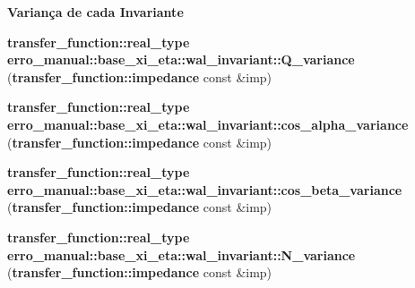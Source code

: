 \begin{Indent}{\bf Variança de cada Invariante}
\begin{CompactItemize}
\item 
{\bf transfer\_\-function::real\_\-type} \textbf{erro\_\-manual::base\_\-xi\_\-eta::wal\_\-invariant::Q\_\-variance} ({\bf transfer\_\-function::impedance} const \&imp)\label{namespaceerro__manual_1_1base__xi__eta_1_1wal__invariant_864b6c7439ca932ea9fa9c437541c1e5}

\item 
{\bf transfer\_\-function::real\_\-type} \textbf{erro\_\-manual::base\_\-xi\_\-eta::wal\_\-invariant::cos\_\-alpha\_\-variance} ({\bf transfer\_\-function::impedance} const \&imp)\label{namespaceerro__manual_1_1base__xi__eta_1_1wal__invariant_04e45faaed0f16cb63d625fcf428ec4a}

\item 
{\bf transfer\_\-function::real\_\-type} \textbf{erro\_\-manual::base\_\-xi\_\-eta::wal\_\-invariant::cos\_\-beta\_\-variance} ({\bf transfer\_\-function::impedance} const \&imp)\label{namespaceerro__manual_1_1base__xi__eta_1_1wal__invariant_882b846ebcb73a1a4276d04d984f4594}

\item 
{\bf transfer\_\-function::real\_\-type} \textbf{erro\_\-manual::base\_\-xi\_\-eta::wal\_\-invariant::N\_\-variance} ({\bf transfer\_\-function::impedance} const \&imp)\label{namespaceerro__manual_1_1base__xi__eta_1_1wal__invariant_e54899e982e959ea92bc1d022902a487}

\end{CompactItemize}
\end{Indent}
